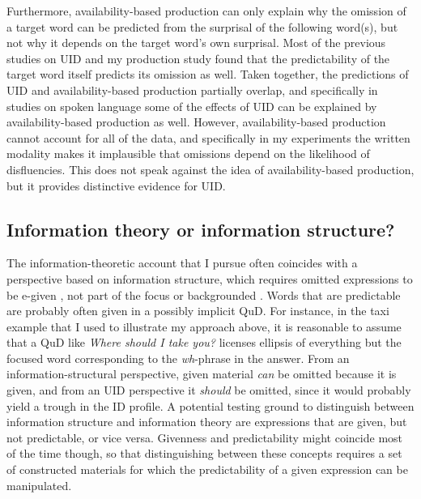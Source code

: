 Furthermore, availability-based production can only explain why the omission of a target word can be predicted from the surprisal of the following word(s), but not why it depends on the target word's own surprisal. Most of the previous studies on UID and my production study found that the predictability of the target word itself predicts its omission as well. Taken together, the predictions of UID and availability-based production partially overlap, and specifically in studies on spoken language some of the effects of UID can be explained by availability-based production as well. However, availability-based production cannot account for all of the data, and specifically in my experiments the written modality makes it implausible that omissions depend on the likelihood of disfluencies. This does not speak against the idea of availability-based production, but it provides distinctive evidence for UID.

\subsection{Information theory or information structure?}
The information-theoretic account that I pursue often coincides with a perspective based on information structure, which requires omitted expressions to be e-given \citep{merchant2004}, not part of the focus \citep{reich2007} or backgrounded \citep{ott.struckmeier2016}. Words that are predictable are probably often given in a possibly implicit QuD. For instance, in the taxi example that I used to illustrate my approach above, it is reasonable to assume that a QuD like \textit{Where should I take you?} licenses ellipsis of everything but the focused word corresponding to the \textit{wh}-phrase in the answer. From an information-structural perspective, given material \textit{can} be omitted because it is given, and from an UID perspective it \textit{should} be omitted, since it would probably yield a trough in the ID profile. A potential testing ground to distinguish between information structure and information theory are expressions that are given, but not predictable, or vice versa. Givenness and predictability might coincide most of the time though, so that distinguishing between these concepts requires a set of constructed materials for which the predictability of a given expression can be manipulated.

